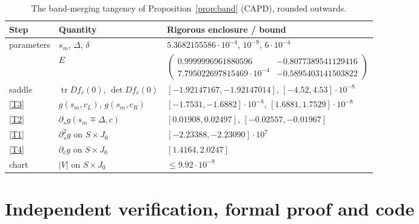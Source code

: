 \documentclass[11pt]{amsart}
\theoremstyle{definition}
\theoremstyle{remark}
\begin{document}
\begin{table}[t]
\centering
\footnotesize
\begin{tabular}{@{}lll@{}}
\toprule
Step & Quantity & Rigorous enclosure / bound\\
\midrule
parameters & $s_m$, $\Delta$, $\delta$ & $5.3682155586\cdot10^{-4}$, $10^{-9}$, $6\cdot10^{-4}$\\
& $E$ & $\begin{pmatrix}0.9999996961880596 & -0.8077389541129416\\ 7.795022697815469\cdot10^{-4} & -0.5895403141503822\end{pmatrix}$\\
saddle & $\operatorname{tr}Df_c(0)$, $\det Df_c(0)$ & $[-1.92147167,-1.92147014]$, $[-4.52,4.53]\cdot10^{-8}$\\
\ref{T3} & $g(s_m,c_L)$, $g(s_m,c_R)$ & $[-1.7531,-1.6882]\cdot10^{-8}$, $[1.6881,1.7529]\cdot10^{-8}$\\
\ref{T2} & $\partial_sg(s_m\mp\Delta,c)$ & $[0.01908,0.02497]$, $[-0.02557,-0.01967]$\\
\ref{T1} & $\partial_s^2g$ on $S\times J_0$ & $[-2.23388,-2.23090]\cdot10^{7}$\\
\ref{T4} & $\partial_cg$ on $S\times J_0$ & $[1.4164,2.0247]$\\
chart & $|V|$ on $S\times J_0$ & $\le9.92\cdot10^{-9}$\\
\bottomrule
\end{tabular}
\vspace{4pt}
\caption{The band-merging tangency of Proposition~\ref{prop:band} (CAPD), rounded outwards.}
\label{tab:band}
\end{table}

\section{Independent verification, formal proof and code}\label{sec:indep}
\end{document}
